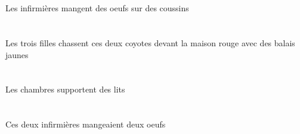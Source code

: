 \begin{exe}
    \INDPlOblP{}   \coussinBPlOblP{}   \SURP{}   \DEFPlErgP{}   \infirmiereAPlErgP{}   \INDPlAbsP{}   \oeufCPlAbsP{}  \mangerVtPrsCPlP{} \\
    \INDPlOblG{}   \coussinBPlOblG{}   \SURG{}   \DEFPlErgG{}   \infirmiereAPlErgG{}   \INDPlAbsG{}   \oeufCPlAbsG{}  \mangerVtPrsCPlG{} \\
 Les infirmières mangent des oeufs sur des coussins
\ex\glll
    \INDPlObl{}   \jauneAPl{}   \balaiAPlObl{}   \AVEC{}   \DEFPlErg{}   \troisCPl{}   \filleCPlErg{}   \DEMDuAbs{}    \DEFSgObl{}   \rougeDSg{}   \maisonDSgObl{}   \DEVANT{}   \coyoteCDuAbs{}  \chasserVtPrsCDu{} \\
    \INDPlOblP{}   \jauneAPlP{}   \balaiAPlOblP{}   \AVECP{}   \DEFPlErgP{}   \troisCPlP{}   \filleCPlErgP{}   \DEMDuAbsP{}    \DEFSgOblP{}   \rougeDSgP{}   \maisonDSgOblP{}   \DEVANTP{}   \coyoteCDuAbsP{}  \chasserVtPrsCDuP{} \\
    \INDPlOblG{}   \jauneAPlG{}   \balaiAPlOblG{}   \AVECG{}   \DEFPlErgG{}   \troisCPlG{}   \filleCPlErgG{}   \DEMDuAbsG{}    \DEFSgOblG{}   \rougeDSgG{}   \maisonDSgOblG{}   \DEVANTG{}   \coyoteCDuAbsG{}  \chasserVtPrsCDuG{} \\
 Les trois filles chassent ces deux coyotes devant la maison rouge avec des balais jaunes
\ex\glll
   \DEFPlErg{}   \chambreBPlErg{}   \INDPlAbs{}   \litDPlAbs{}  \supporterVtPrsDPl{} \\
   \DEFPlErgP{}   \chambreBPlErgP{}   \INDPlAbsP{}   \litDPlAbsP{}  \supporterVtPrsDPlP{} \\
   \DEFPlErgG{}   \chambreBPlErgG{}   \INDPlAbsG{}   \litDPlAbsG{}  \supporterVtPrsDPlG{} \\
 Les chambres supportent des lits
\ex\glll
   \DEMDuErg{}   \infirmiereADuErg{}   \INDDuAbs{}   \oeufCDuAbs{}  \mangerVtPstCDu{} \\
   \DEMDuErgP{}   \infirmiereADuErgP{}   \INDDuAbsP{}   \oeufCDuAbsP{}  \mangerVtPstCDuP{} \\
   \DEMDuErgG{}   \infirmiereADuErgG{}   \INDDuAbsG{}   \oeufCDuAbsG{}  \mangerVtPstCDuG{} \\
 Ces deux infirmières mangeaient deux oeufs
\ex\glll
   \INDSgErg{}   \NabilDSgErg{}    \DEFSgDat{}   \grandASg{}   \infirmiereASgDat{}   \INDSgAbs{}   \petitDSg{}   \litDSgAbs{}  \donnerVdPstDSg{} \\
   \INDSgErgP{}   \NabilDSgErgP{}    \DEFSgDatP{}   \grandASgP{}   \infirmiereASgDatP{}   \INDSgAbsP{}   \petitDSgP{}   \litDSgAbsP{}  \donnerVdPstDSgP{} \\
   \INDSgErgG{}   \NabilDSgErgG{}    \DEFSgDatG{}   \grandASgG{}   \infirmiereASgDatG{}   \INDSgAbsG{}   \petitDSgG{}   \litDSgAbsG{}  \donnerVdPstDSgG{} \\

\end{exe}
